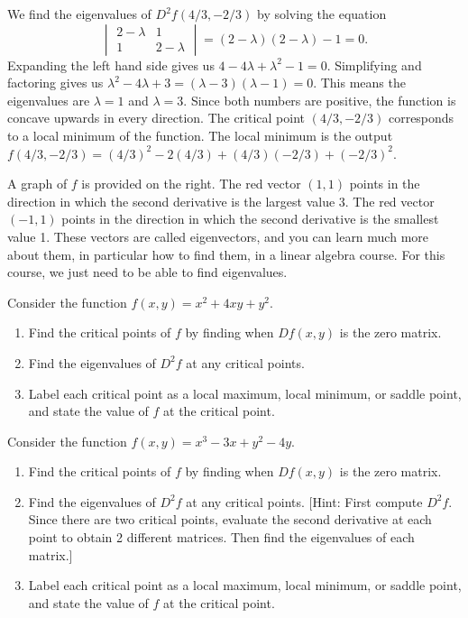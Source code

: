 \begin{example}
{}
We find the eigenvalues of $D^2 f(4/3,-2/3)$ by solving the equation 
$$\begin{vmatrix}2-\lambda&1 \\1&2-\lambda\end{vmatrix} = (2-\lambda)(2-\lambda)-1=0.$$ 
 Expanding the left hand side gives us {$4-4\lambda + \lambda^2 -1 = 0$}. Simplifying and factoring gives us $\lambda^2-4\lambda +3 = (\lambda-3)(\lambda -1) = 0$. This means the eigenvalues are $\lambda = 1$ and $\lambda=3$. Since both numbers are positive, the function is concave upwards in every direction.  The critical point $(4/3,-2/3)$ corresponds to a local minimum of the function. The local minimum is the output $f(4/3,-2/3) = (4/3)^2-2(4/3)+(4/3)(-2/3)+(-2/3)^2$.

A graph of $f$ is provided on the right. 
The red vector $(1,1)$ points in the direction in which the second derivative is the largest value 3. 
The red vector $(-1,1)$ points in the direction in which the second derivative is the smallest value 1.
These vectors are called eigenvectors, and you can learn much more about them, in particular how to find them, in a linear algebra course. For this course, we just need to be able to find eigenvalues.
\end{example}
 
\begin{problem}
Consider the function $f(x,y)=x^2+4xy+y^2$.  
\begin{enumerate}
 \item Find the critical points of $f$ by finding when $Df(x,y)$ is the zero matrix.
 \item Find the eigenvalues of $D^2f$ at any critical points.
 \item Label each critical point as a local maximum, local minimum, or saddle point, and state the value of $f$ at the critical point.
\end{enumerate}
\end{problem}

\begin{problem}
Consider the function $f(x,y)=x^3-3x+y^2-4y$.  
\begin{enumerate}
 \item Find the critical points of $f$ by finding when $Df(x,y)$ is the zero matrix.
 \item Find the eigenvalues of $D^2f$ at any critical points. [Hint: First compute $D^2f$. Since there are two critical points, evaluate the second derivative at each point to obtain 2 different matrices. Then find the eigenvalues of each matrix.]
 \item Label each critical point as a local maximum, local minimum, or saddle point, and state the value of $f$ at the critical point.
\end{enumerate}
\end{problem}

